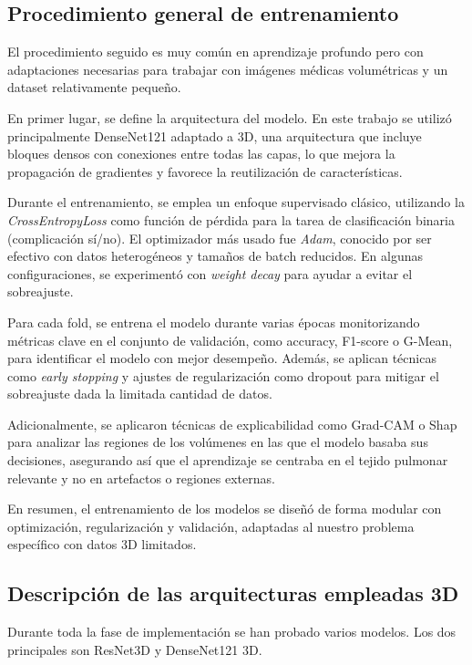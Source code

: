 \subsection{Procedimiento general de entrenamiento}

El procedimiento seguido es muy común en aprendizaje profundo pero con adaptaciones necesarias para trabajar con imágenes médicas volumétricas y un dataset relativamente pequeño.

En primer lugar, se define la arquitectura del modelo. En este trabajo se utilizó principalmente DenseNet121 adaptado a 3D, una arquitectura que incluye bloques densos con conexiones entre todas las capas, lo que mejora la propagación de gradientes y favorece la reutilización de características. 

Durante el entrenamiento, se emplea un enfoque supervisado clásico, utilizando la \textit{CrossEntropyLoss} como función de pérdida para la tarea de clasificación binaria (complicación sí/no). El optimizador más usado fue \textit{Adam}, conocido por ser efectivo con datos heterogéneos y tamaños de batch reducidos. En algunas configuraciones, se experimentó con \textit{weight decay} para ayudar a evitar el sobreajuste.

Para cada fold, se entrena el modelo durante varias épocas monitorizando métricas clave en el conjunto de validación, como accuracy, F1-score o G-Mean, para identificar el modelo con mejor desempeño. Además, se aplican técnicas como \textit{early stopping} y ajustes de regularización como dropout para mitigar el sobreajuste dada la limitada cantidad de datos.

Adicionalmente, se aplicaron técnicas de explicabilidad como Grad-CAM o Shap para analizar las regiones de los volúmenes en las que el modelo basaba sus decisiones, asegurando así que el aprendizaje se centraba en el tejido pulmonar relevante y no en artefactos o regiones externas. 

En resumen, el entrenamiento de los modelos se diseñó de forma modular con optimización, regularización y validación, adaptadas al nuestro problema específico con datos 3D limitados.



\subsection{Descripción de las arquitecturas empleadas 3D}
Durante toda la fase de implementación se han probado varios modelos. Los dos principales son ResNet3D y DenseNet121 3D. 

